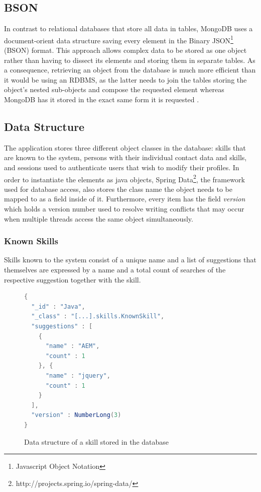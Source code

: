 \subsection{BSON}
\label{BSON}
In contrast to relational databases that store all data in tables, MongoDB uses a document-orient data structure saving every element in the Binary JSON\footnote{Javascript Object Notation} (BSON) format. This approach allows complex data to be stored as one object rather than having to dissect its elements and storing them in separate tables. As a consequence, retrieving an object from the database is much more efficient than it would be using an RDBMS, as the latter needs to join the tables storing the object's nested sub-objects and compose the requested element whereas MongoDB has it stored in the exact same form it is requested \cite[p. 10]{MongoGuide}.

\subsection{Data Structure}
The application stores three different object classes in the database: skills that are known to the system, persons with their individual contact data and skills, and sessions used to authenticate users that wish to modify their profiles. In order to instantiate the elements as java objects, Spring Data\footnote{http://projects.spring.io/spring-data/}, the framework used for database access, also stores the class name the object needs to be mapped to as a field inside of it. Furthermore, every item has the field \textit{version} which holds a version number used to resolve writing conflicts that may occur when multiple threads access the same object simultaneously.

\newpage
\subsubsection{Known Skills}
Skills known to the system consist of a unique name and a list of suggestions that themselves are expressed by a name and a total count of searches of the respective suggestion together with the skill.
\begin{figure}[h]
\begin{lstlisting}[language=Java]
{
  "_id" : "Java",
  "_class" : "[...].skills.KnownSkill",
  "suggestions" : [
    {
      "name" : "AEM",
      "count" : 1
    }, {
      "name" : "jquery",
      "count" : 1
    }
  ],
  "version" : NumberLong(3)
}
\end{lstlisting}
\caption[Skill (DB Data Structure)]{Data structure of a skill stored in the database}
\end{figure}

